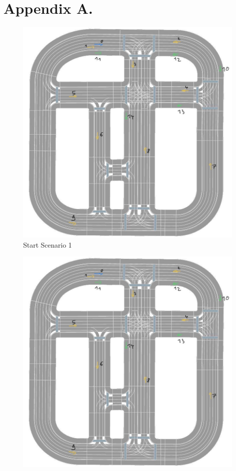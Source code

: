 \chapter{Appendix A.}
\label{chap:appendix_a}

\begin{figure}[ht] 
	\centering
	\begin{minipage}[b]{0.43\linewidth}
		\centering
		\includegraphics[width=1\linewidth]{figures/start_scenarios/scenario_v3} 
		Start Scenario 1
	\end{minipage}%
	\begin{minipage}[b]{0.43\linewidth}
		\centering
		\includegraphics[width=1\linewidth]{figures/start_scenarios/scenario_v3} 

\end{minipage}
\end{figure}
